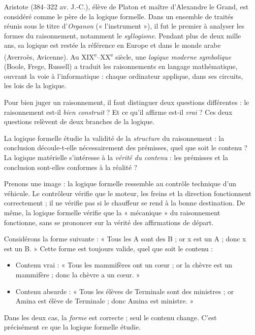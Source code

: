 \documentclass[11pt]{article}
\newcommand{\cle}[1]{{\popxbold\color{popdark}#1}}
\newcounter{popsec}
\newcounter{popsub}
\newcommand{\courssub}[1]{%
  \stepcounter{popsub}%
  \par\vspace{9pt}\noindent{\popxbold\fontsize{11.5}{13}\selectfont\color{popink}{\color{poporange}\thepopsec.\thepopsub}\hspace{6pt}#1}\par\nopagebreak\vspace{4pt}
}
\begin{document}
\begin{savaistu}
Aristote (384--322 av. J.-C.), élève de Platon et maître d'Alexandre le Grand, est considéré comme le père de la logique formelle. Dans un ensemble de traités réunis sous le titre d'\emph{Organon} (« l'instrument »), il fut le premier à analyser les formes du raisonnement, notamment le \emph{syllogisme}. Pendant plus de deux mille ans, sa logique est restée la référence en Europe et dans le monde arabe (Averroès, Avicenne). Au XIX\textsuperscript{e}--XX\textsuperscript{e} siècle, une \emph{logique moderne symbolique} (Boole, Frege, Russell) a traduit les raisonnements en langage mathématique, ouvrant la voie à l'informatique : chaque ordinateur applique, dans ses circuits, les lois de la logique.
\end{savaistu}

\courssub{Logique formelle et logique matérielle}

Pour bien juger un raisonnement, il faut distinguer deux questions différentes : le raisonnement est-il \emph{bien construit} ? Et ce qu'il affirme est-il \emph{vrai} ? Ces deux questions relèvent de deux branches de la logique.

\begin{definition}
La \cle{logique formelle} étudie la validité de la \emph{structure} du raisonnement : la conclusion découle-t-elle nécessairement des prémisses, quel que soit le contenu ? La \cle{logique matérielle} s'intéresse à la \emph{vérité du contenu} : les prémisses et la conclusion sont-elles conformes à la réalité ?
\end{definition}

Prenons une image : la logique formelle ressemble au contrôle technique d'un véhicule. Le contrôleur vérifie que le moteur, les freins et la direction fonctionnent correctement ; il ne vérifie pas si le chauffeur se rend à la bonne destination. De même, la logique formelle vérifie que la « mécanique » du raisonnement fonctionne, sans se prononcer sur la vérité des affirmations de départ.

\begin{exemplebox}
Considérons la forme suivante : « Tous les A sont des B ; or x est un A ; donc x est un B. » Cette forme est toujours valide, quel que soit le contenu :
\begin{itemize}
\item Contenu vrai : « Tous les mammifères ont un cœur ; or la chèvre est un mammifère ; donc la chèvre a un cœur. »
\item Contenu absurde : « Tous les élèves de Terminale sont des ministres ; or Amina est élève de Terminale ; donc Amina est ministre. »
\end{itemize}
Dans les deux cas, la \emph{forme} est correcte ; seul le contenu change. C'est précisément ce que la logique formelle étudie.
\end{exemplebox}
\end{document}

